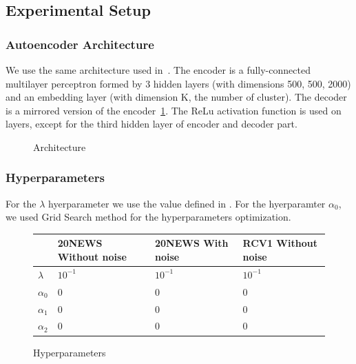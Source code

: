 \subsection{Experimental Setup}
\subsubsection{Autoencoder Architecture}
We use the same architecture used in~\cite{Deap-K-Means}. The encoder is a fully-connected 
multilayer perceptron formed by 3 hidden layers (with dimensions 500, 500, 2000) 
and an embedding layer (with dimension K, the number of cluster). 
The decoder is a mirrored version of the encoder~\ref{fig:archi}.
The ReLu activation function is used on layers, except for the third
hidden layer of encoder and decoder part.  
\begin{figure}[!h]
  \centering
  \caption{\label{fig:archi}Architecture}
\end{figure}
 
\subsubsection{Hyperparameters}
For the $\lambda$ hyerparameter we use the value defined in \cite{Deap-K-Means}. 
For the hyerparamter $\alpha_0$, we used Grid Search method for 
the hyperparameters optimization.
\begin{figure}[!h]
  \centering
  \begin{tabular}{| l | l | l | l |}
    \hline
    & 20NEWS Without noise & 20NEWS With noise & RCV1 Without noise  \\ \hline
    $\lambda$ & $10^{-1}$ & $10^{-1}$ & $10^{-1}$ \\ \hline
    $\alpha_0$ & 0 & 0 & 0 \\ \hline
    $\alpha_1$ & 0 & 0 & 0 \\ \hline
    $\alpha_2$ & 0 & 0 & 0 \\ \hline
  \end{tabular}
  \caption{\label{tab2}Hyperparameters}
\end{figure}
